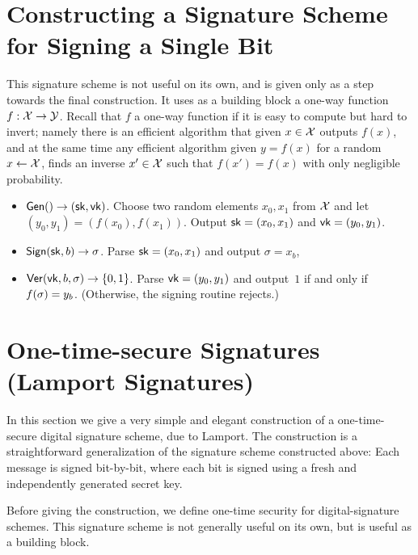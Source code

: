 \section{Constructing a Signature Scheme for Signing a Single Bit}

This signature scheme is not useful on its own, and is given only as a step towards the final construction.  It uses as a building block a one-way function $f:\mathcal{X}\rightarrow\mathcal{Y}$.  Recall that $f$ a one-way function if it is easy to compute but hard to invert; namely there is an efficient algorithm that given $x\in\mathcal{X}$ outputs $f(x)$, and at the same time any efficient algorithm given $y=f(x)$ for a random $x\leftarrow \cal X$, finds an inverse $x'\in\mathcal{X}$ such that $f(x')=f(x)$ with only negligible probability.  

\begin{itemize}
  \item $\mathsf{Gen}() \to ({\mathsf{sk}}, \mathsf{vk})$. 
    Choose two random elements $x_0, x_1$ from $\mathcal{X}$ and let $(y_0,y_1)=(f(x_0),f(x_1))$.  Output ${\mathsf{sk}}=(x_0,x_1)$ and $\mathsf{vk}=(y_0,y_1)$.
    
	\item $\mathsf{Sign}({\mathsf{sk}}, b) \to \sigma$.  Parse ${\mathsf{sk}}=(x_0,x_1)$ and output $\sigma=x_b$, 
	\item $\mathsf{Ver}(\mathsf{vk}, b, \sigma) \to \{0,1\}$. Parse $\mathsf{vk}=(y_0,y_1)$ and output~$1$ if and only if $f(\sigma)=y_b$. 
    (Otherwise, the signing routine rejects.)
\end{itemize}


\section{One-time-secure Signatures (Lamport Signatures)} \label{sec:lamport}

In this section we give a very simple and elegant construction 
of a one-time-secure digital signature scheme, due to Lamport.\autocite{L79}
The construction is a straightforward generalization of  the signature scheme constructed above:  Each message is signed bit-by-bit, where each bit is signed using a fresh and independently generated secret key. 


Before giving the construction, we define one-time security for 
digital-signature schemes.
This signature scheme is not generally useful on its own, but is
useful as a building block.

